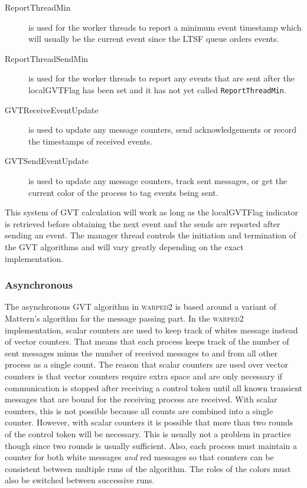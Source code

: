 \documentclass[11pt]{book}
\begin{document}
\begin{description}
    \item[ReportThreadMin ] is used for the worker threads to report a minimum event timestamp which
      will usually be the current event since the LTSF queue orders events.
    \item[ReportThreadSendMin ] is used for the worker threads to report any events that are sent
      after the localGVTFlag has been set and it has not yet called \texttt{ReportThreadMin}.
    \item[GVTReceiveEventUpdate ] is used to update any message counters, send acknowledgements or
      record the timestamps of received events.
    \item[GVTSendEventUpdate ] is used to update any message counters, track sent messages, or get
      the current color of the process to tag events being sent.
\end{description}

\noindent
This system of GVT calculation will work as long as the localGVTFlag indicator is retrieved before
obtaining the next event and the sends are reported after sending an event.  The manager thread
controls the initiation and termination of the GVT algorithms and will vary greatly depending
on the exact implementation.

\subsubsection{Asynchronous}

The asynchronous GVT algorithm in \textsc{warped2} is based around a variant of Mattern's algorithm
\cite{mattern-93} for the message passing part.  In the \textsc{warped2} implementation, scalar
counters are used to keep track of whites message instead of vector counters.  That means that each
process keeps track of the number of sent messages minus the number of received messages to and from
all other process as a single count.  The reason that scalar counters are used over vector counters
is that vector counters require extra space and are only necessary if communication is stopped after
receiving a control token until all known transient messages that are bound for the receiving
process are received.  With scalar counters, this is not possible because all counts are combined
into a single counter.  However, with scalar counters it is possible that more than two rounds of
the control token will be necessary.  This is usually not a problem in practice though since two
rounds is usually sufficient.  Also, each process must maintain a counter for both white messages
\emph{and} red messages so that counters can be consistent between multiple runs of the algorithm.
The roles of the colors must also be switched between successive runs.
\end{document}
